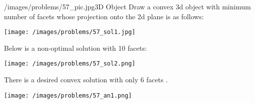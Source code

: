 \begin{problem}{/images/problems/57_pic.jpg}{3D Object}  Draw a convex 3d object with minimum number of facets whose projection onto the 2d plane is as follows:
	\begin{center}
		\texttt{[image: /images/problems/57\_sol1.jpg]}
	\end{center}
Below is a non-optimal solution with 10 facets:
	\begin{center}
	\texttt{[image: /images/problems/57\_sol2.png]}
\end{center}

\end{problem}
\begin{solution}
	There is a desired convex solution with only 6 facets .\\[0.2cm]
\begin{center}
	\texttt{[image: /images/problems/57\_an1.png]}
\end{center}
\end{solution}
